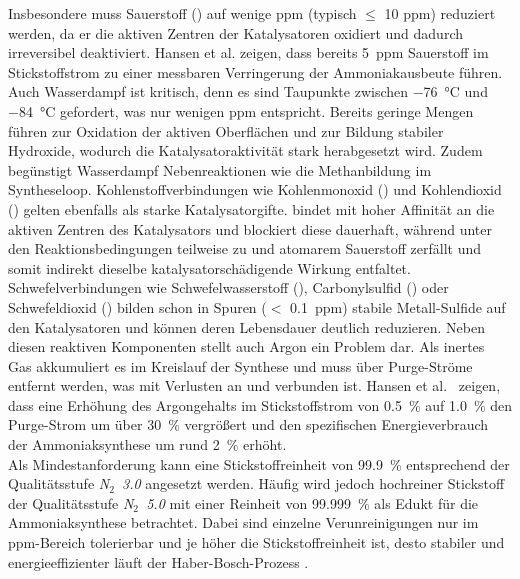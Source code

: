 Insbesondere muss Sauerstoff () auf wenige ppm (typisch $\leq$ 10 ppm) reduziert werden, da er die aktiven Zentren der Katalysatoren oxidiert und dadurch irreversibel deaktiviert. Hansen et al. \cite{hansenImportanceGasPurity2025} zeigen, dass bereits \SI{5}{ppm} Sauerstoff im Stickstoffstrom zu einer messbaren Verringerung der Ammoniakausbeute führen. Auch Wasserdampf ist kritisch, denn es sind Taupunkte zwischen \SI{-76}{\celsius} und \SI{-84}{\celsius} gefordert, was nur wenigen ppm  entspricht. Bereits geringe Mengen führen zur Oxidation der aktiven Oberflächen und zur Bildung stabiler Hydroxide, wodurch die Katalysatoraktivität stark herabgesetzt wird. Zudem begünstigt Wasserdampf Nebenreaktionen wie die Methanbildung im Syntheseloop. Kohlenstoffverbindungen wie Kohlenmonoxid () und Kohlendioxid () gelten ebenfalls als starke Katalysatorgifte.  bindet mit hoher Affinität an die aktiven Zentren des Katalysators und blockiert diese dauerhaft, während  unter den Reaktionsbedingungen teilweise zu  und atomarem Sauerstoff zerfällt und somit indirekt dieselbe katalysatorschädigende Wirkung entfaltet. Schwefelverbindungen wie Schwefelwasserstoff (), Carbonylsulfid () oder Schwefeldioxid () bilden schon in Spuren ($<$ \SI{0,1}{ppm}) stabile Metall-Sulfide auf den Katalysatoren und können deren Lebensdauer deutlich reduzieren. Neben diesen reaktiven Komponenten stellt auch Argon ein Problem dar. Als inertes Gas akkumuliert es im Kreislauf der Synthese und muss über Purge-Ströme entfernt werden, was mit Verlusten an  und  verbunden ist. Hansen et al.\ \cite{hansenImportanceGasPurity2025} zeigen, dass eine Erhöhung des Argongehalts im Stickstoffstrom von \SI{0,5}{\percent} auf \SI{1,0}{\percent} den Purge-Strom um über \SI{30}{\percent} vergrößert und den spezifischen Energieverbrauch der Ammoniaksynthese um rund \SI{2}{\percent} erhöht. \cite{applAmmonia2Production2011, humphreysDevelopmentRecentProgress2021} \\
Als Mindestanforderung kann eine Stickstoffreinheit von \SI{99,9}{\percent} entsprechend der Qualitätsstufe \emph{N$_2$~3.0} angesetzt werden. Häufig wird jedoch hochreiner Stickstoff der Qualitätsstufe \emph{N$_2$~5.0} mit einer Reinheit von \SI{99.999}{\percent} als Edukt für die Ammoniaksynthese betrachtet. Dabei sind einzelne Verunreinigungen nur im ppm-Bereich tolerierbar und je höher die Stickstoffreinheit ist, desto stabiler und energieeffizienter läuft der Haber-Bosch-Prozess \cite{hansenImportanceGasPurity2025, humphreysDevelopmentRecentProgress2021}.\\
